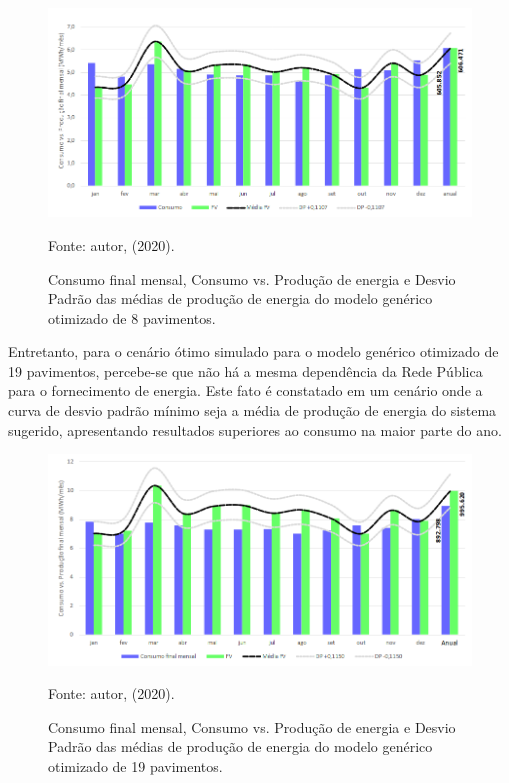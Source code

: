 \begin{figure}[H]
    \centering
    \caption{Consumo final mensal, Consumo vs. Produção de energia e Desvio Padrão das médias de produção de energia do modelo genérico otimizado de 8 pavimentos.}
    \includegraphics[width=1.0\textwidth]{figures/result/fig43-consumofinal.png}
    \begin{flushleft}
        \par \small Fonte: autor, (2020).
    \end{flushleft}
    \label{fig:figure31}
\end{figure}
\noindent Entretanto, para o cenário ótimo simulado para o modelo genérico otimizado de 19 pavimentos, percebe-se que não há a mesma dependência da Rede Pública para o fornecimento de energia. Este fato é constatado em um cenário onde a curva de desvio padrão mínimo seja a média de produção de energia do sistema sugerido, apresentando resultados superiores ao consumo na maior parte do ano.
\begin{figure}[H]
    \centering
    \caption{Consumo final mensal, Consumo vs. Produção de energia e Desvio Padrão das médias de produção de energia do modelo genérico otimizado de 19 pavimentos.}
    \includegraphics[width=1.0\textwidth]{figures/result/fig44-consumofinal.png}
    \begin{flushleft}
        \par \small Fonte: autor, (2020).
    \end{flushleft}
    \label{fig:figure32}
\end{figure}